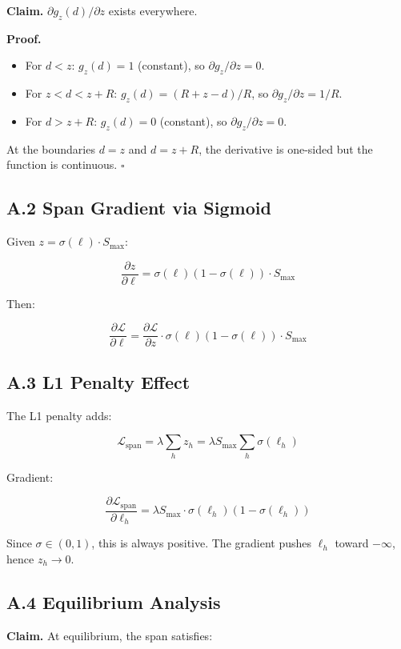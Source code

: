 \textbf{Claim.} $\partial g_z(d) / \partial z$ exists everywhere.

\textbf{Proof.} 

\begin{itemize}
\item For $d < z$: $g_z(d) = 1$ (constant), so $\partial g_z / \partial z = 0$.
\item For $z < d < z + R$: $g_z(d) = (R + z - d) / R$, so $\partial g_z / \partial z = 1/R$.
\item For $d > z + R$: $g_z(d) = 0$ (constant), so $\partial g_z / \partial z = 0$.

\end{itemize}
At the boundaries $d = z$ and $d = z + R$, the derivative is one-sided but 
the function is continuous. $\square$

\subsection{A.2 Span Gradient via Sigmoid}

Given $z = \sigma(\ell) \cdot S_\text{max}$:

\[
\frac{\partial z}{\partial \ell} = \sigma(\ell)(1 - \sigma(\ell)) \cdot S_\text{max}
\]

Then:

\[
\frac{\partial \mathcal{L}}{\partial \ell} = \frac{\partial \mathcal{L}}{\partial z} \cdot \sigma(\ell)(1 - \sigma(\ell)) \cdot S_\text{max}
\]

\subsection{A.3 L1 Penalty Effect}

The L1 penalty adds:

\[
\mathcal{L}_\text{span} = \lambda \sum_h z_h = \lambda S_\text{max} \sum_h \sigma(\ell_h)
\]

Gradient:

\[
\frac{\partial \mathcal{L}_\text{span}}{\partial \ell_h} = \lambda S_\text{max} \cdot \sigma(\ell_h)(1 - \sigma(\ell_h))
\]

Since $\sigma \in (0, 1)$, this is always positive. The gradient pushes 
$\ell_h$ toward $-\infty$, hence $z_h \to 0$.

\subsection{A.4 Equilibrium Analysis}

\textbf{Claim.} At equilibrium, the span satisfies:

